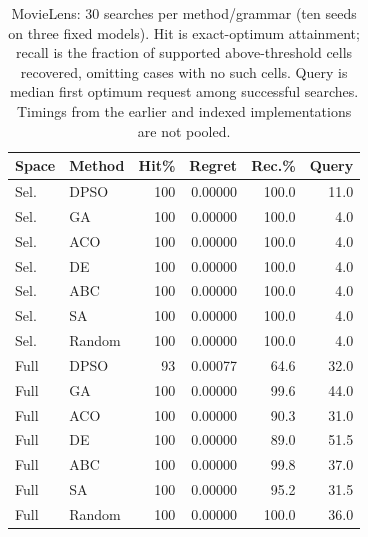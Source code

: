 \begin{table}[t]
\centering
\caption{MovieLens: 30 searches per method/grammar (ten seeds on three fixed models). Hit is exact-optimum attainment; recall is the fraction of supported above-threshold cells recovered, omitting cases with no such cells. Query is median first optimum request among successful searches. Timings from the earlier and indexed implementations are not pooled.}
\label{tab:extended-neumf}
\small
\begin{tabular}{llrrrr}
\toprule
Space & Method & Hit\% & Regret & Rec.\% & Query \\
\midrule
Sel. & DPSO & 100 & 0.00000 & 100.0 & 11.0 \\
Sel. & GA & 100 & 0.00000 & 100.0 & 4.0 \\
Sel. & ACO & 100 & 0.00000 & 100.0 & 4.0 \\
Sel. & DE & 100 & 0.00000 & 100.0 & 4.0 \\
Sel. & ABC & 100 & 0.00000 & 100.0 & 4.0 \\
Sel. & SA & 100 & 0.00000 & 100.0 & 4.0 \\
Sel. & Random & 100 & 0.00000 & 100.0 & 4.0 \\
Full & DPSO & 93 & 0.00077 & 64.6 & 32.0 \\
Full & GA & 100 & 0.00000 & 99.6 & 44.0 \\
Full & ACO & 100 & 0.00000 & 90.3 & 31.0 \\
Full & DE & 100 & 0.00000 & 89.0 & 51.5 \\
Full & ABC & 100 & 0.00000 & 99.8 & 37.0 \\
Full & SA & 100 & 0.00000 & 95.2 & 31.5 \\
Full & Random & 100 & 0.00000 & 100.0 & 36.0 \\
\bottomrule
\end{tabular}
\end{table}
